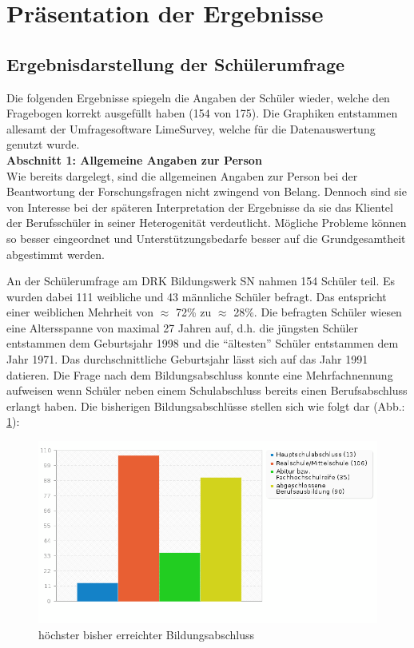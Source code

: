 \section{Präsentation der Ergebnisse}
\label{sec:PräsentationDerErgebnisse}

\subsection{Ergebnisdarstellung der Schülerumfrage}
\label{sec:ErgebnisdarstellungDerSchülerumfrage}

Die folgenden Ergebnisse spiegeln die Angaben der Schüler wieder, welche den Fragebogen korrekt ausgefüllt haben (154 von 175). Die Graphiken entstammen allesamt der Umfragesoftware LimeSurvey, welche für die Datenauswertung genutzt wurde.\\

\noindent
\textbf{Abschnitt 1: Allgemeine Angaben zur Person}\\

\noindent
Wie bereits dargelegt, sind die allgemeinen Angaben zur Person bei der Beantwortung der Forschungsfragen nicht zwingend von Belang. Dennoch sind sie von Interesse bei der späteren Interpretation der Ergebnisse da sie das Klientel der Berufsschüler in seiner Heterogenität verdeutlicht. Mögliche Probleme können so besser eingeordnet und Unterstützungsbedarfe besser auf die Grundgesamtheit abgestimmt werden.

An der Schülerumfrage am DRK Bildungswerk SN nahmen 154 Schüler teil. Es wurden dabei 111 weibliche und 43 männliche
Schüler befragt. Das entspricht einer weiblichen Mehrheit von $\approx$ 72\% zu $\approx$ 28\%. Die befragten Schüler wiesen eine Altersspanne von maximal 27 Jahren auf, d.h. die jüngsten Schüler entstammen dem Geburtsjahr 1998 und die "`ältesten"' Schüler entstammen dem Jahr 1971. Das durchschnittliche Geburtsjahr lässt sich auf das Jahr 1991 datieren. Die Frage nach dem Bildungsabschluss konnte eine Mehrfachnennung aufweisen wenn Schüler neben einem Schulabschluss bereits einen Berufsabschluss erlangt haben. Die bisherigen Bildungsabschlüsse stellen sich wie folgt dar (Abb.: \ref{fig:Hoechster-bisher-erreichter-Bildungsabschluss}):

\begin{figure}[h]
	\centering
		\includegraphics[width=1.0\textwidth]{images/Hoechster-bisher-erreichter-Bildungsabschluss.png}
	\caption{höchster bisher erreichter Bildungsabschluss}
	\label{fig:Hoechster-bisher-erreichter-Bildungsabschluss}
\end{figure}

